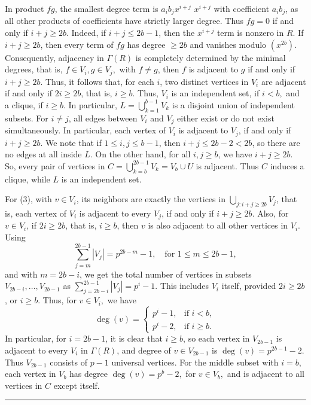\documentclass[12pt,twoside]{article}
\renewenvironment{proof}{{\noindent\bfseries Proof.}}{\qed}
\def\qed{\nolinebreak\hfill\rule{.2cm}{.2cm}\par\addvspace{.5cm}}
\begin{document}
\begin{proof}
		In product $fg$, the smallest degree term is $a_i b_j x^{i+j}$ $x^{i+j}$ with coefficient $a_i b_j$, as all other products of coefficients have strictly larger degree. Thus $fg = 0  $ if and only if $ i+j \ge 2b.$ Indeed, if $i+j \le 2b-1$, then the $x^{i+j}$ term is nonzero in $R$. If $i+j\ge 2b$, then every term of $fg$ has degree $\ge 2b$ and vanishes modulo $(x^{2b})$. Consequently, adjacency in $ \varGamma(R)$ is completely determined by the minimal degrees, that is, $f \in V_i,g\in V_j, $ with $ f\neq g$, then $f $ is adjacent to $g $ if and only if $ i+j \ge 2b.$ Thus, it follows that, for each $i$, two distinct vertices in $V_i$ are adjacent if and only if $2i\ge 2b$, that is, $i\ge b$. Thus, $V_i$ is an independent set, if $i<b,$ and a clique, if $i\ge b.$	In particular, $L=\bigcup_{k=1}^{b-1}V_k$ is a disjoint union of independent subsets. For $i\neq j$, all edges between $V_i$ and $V_j$ either exist or do not exist simultaneously. In particular, each vertex of $V_{i}$  is adjacent to $V_j$, if and only if $i+j\geq 2b.$ We note that  if $1\le i,j\le b-1$, then $i+j\le 2b-2<2b$, so there are no edges at all inside $L$. On the other hand, for all $i,j\ge b$, we have $i+j\ge 2b$. So, every pair of vertices in $	C = \bigcup_{k=b}^{2b-1} V_k = V_b \cup U$		is adjacent. Thus $C$ induces a clique, while $L$ is an independent set.
		
		For (3), with $v\in V_i$, its neighbors are exactly the vertices in $\bigcup_{j:i+j\ge 2b} V_j$, that is, each vertex of $V_{i}$ is adjacent to every $V_{j}$, if and only if $i+j\geq 2b.$ Also, for $v\in V_{i}$,  if $2i\ge 2b$, that is,  $i\ge b$, then $v$ is also adjacent to all other vertices in $V_i$. 
		Using
		\[
		\sum_{j=m}^{2b-1} |V_j| = p^{ 2b-m}-1,
		\quad\text{for }1\le m\le 2b-1,
		\]
		and with $m=2b-i$, we get the total number of vertices in subsets $V_{2b-i},\dots,V_{2b-1}$ as $\sum_{j=2b-i}^{2b-1} |V_j| = p^{ i}-1.$
		This includes $V_i$ itself, provided $2i\ge 2b$, or $i\ge b$. Thus, for $v\in V_{i}, $ we have
		\[
		\deg(v) =
		\begin{cases}
			p^{ i}-1, & \text{if } i<b,\\
			p^{ i}-2, & \text{if } i\ge b.
		\end{cases}
		\]
		In particular, for $i=2b-1$, it is clear that $i\ge b$, so each vertex in $V_{2b-1}$ is adjacent to every $V_{i}$ in $ \varGamma(R)$, and degree of $v\in V_{2b-1}$	 is  $\deg(v) = p^{ 2b-1} - 2.$ Thus $V_{2b-1}$ consists of $p-1$ universal vertices. For the middle subset with $i=b$, each vertex in $V_b$ has degree $\deg(v) = p^{ b} - 2, $ for $ v\in V_b,$ and is adjacent to all vertices in $C$ except itself.
		

\end{proof}
\end{document}
